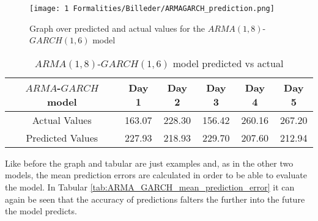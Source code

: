 \begin{figure}[H]
    \centering
    \texttt{[image: 1 Formalities/Billeder/ARMAGARCH\_prediction.png]}
    \caption{Graph over predicted and actual values for the $ARMA(1,8)$-$GARCH(1,6)$ model}
    \label{fig:ARMA_GARCH_model_with_predictions}
\end{figure}

\begin{table}[H]
  \centering
  \begin{tabular}{|c|c|c|c|c|c|}
    \hline
     $ARMA$-$GARCH$ model & Day 1 & Day 2 & Day 3 & Day 4 & Day 5 \\
    \hline
    Actual Values & 163.07 & 228.30 & 156.42 & 260.16 & 267.20 \\
    \hline
    Predicted Values &   227.93 & 218.93 & 229.70 & 207.60 & 212.94 \\
    \hline
  \end{tabular}
  \caption{$ARMA(1,8)$-$GARCH(1,6)$ model predicted vs actual}
  \label{tab:ARMA_GARCH_two_rows}
\end{table}


\noindent Like before the graph and tabular are just examples and, as in the other two models, the mean prediction errors are calculated in order to be able to evaluate the model. In Tabular \ref{tab:ARMA_GARCH_mean_prediction_error} it can again be seen that the accuracy of predictions falters the further into the future the model predicts.

